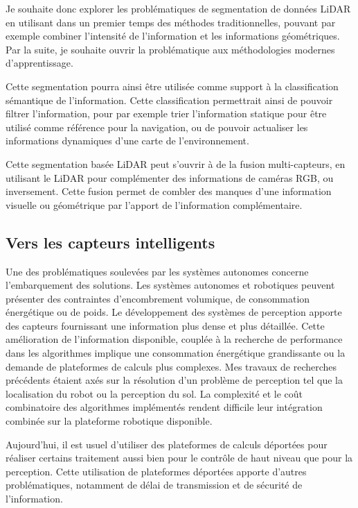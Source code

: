 \documentclass[a4paper, french, 10pt, onecolumn, notitlepage, roman]{article}
\begin{document}
Je souhaite donc explorer les problématiques de segmentation de données LiDAR en utilisant dans un premier temps des méthodes traditionnelles, pouvant par exemple combiner l'intensité de l'information et les informations géométriques.
Par la suite, je souhaite ouvrir la problématique aux méthodologies modernes d'apprentissage.

Cette segmentation pourra ainsi être utilisée comme support à la classification sémantique de l'information.
Cette classification permettrait ainsi de pouvoir filtrer l'information, pour par exemple trier l'information statique pour être utilisé comme référence pour la navigation, ou de pouvoir actualiser les informations dynamiques d'une carte de l'environnement.

Cette segmentation basée LiDAR peut s'ouvrir à de la fusion multi-capteurs, en utilisant le LiDAR pour complémenter des informations de caméras RGB, ou inversement.
Cette fusion permet de combler des manques d'une information visuelle ou géométrique par l'apport de l'information complémentaire.

\subsection{Vers les capteurs intelligents}

Une des problématiques soulevées par les systèmes autonomes concerne l'embarquement des solutions.
Les systèmes autonomes et robotiques peuvent présenter des contraintes d'encombrement volumique, de consommation énergétique ou de poids.
Le développement des systèmes de perception apporte des capteurs fournissant une information plus dense et plus détaillée.
Cette amélioration de l'information disponible, couplée à la recherche de performance dans les algorithmes implique une consommation énergétique grandissante ou la demande de plateformes de calculs plus complexes.
Mes travaux de recherches précédents étaient axés sur la résolution d'un problème de perception tel que la localisation du robot ou la perception du sol.
La complexité et le coût combinatoire des algorithmes implémentés rendent difficile leur intégration combinée sur la plateforme robotique disponible.

Aujourd'hui, il est usuel d'utiliser des plateformes de calculs déportées pour réaliser certains traitement aussi bien pour le contrôle de haut niveau que pour la perception.
Cette utilisation de plateformes déportées apporte d'autres problématiques, notamment de délai de transmission et de sécurité de l'information.
\end{document}

